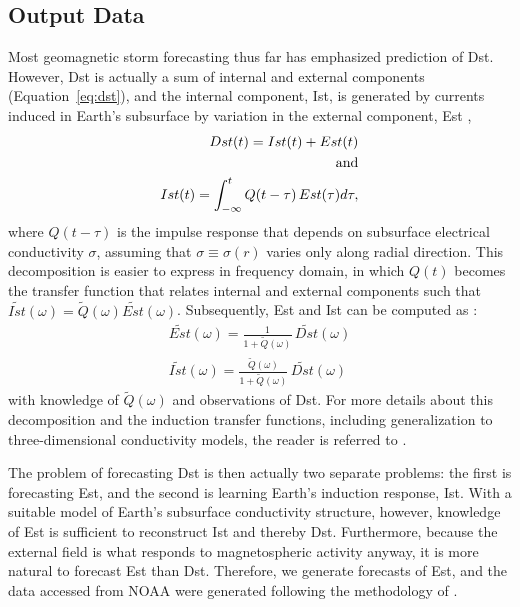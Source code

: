 \documentclass[draft,linenumbers]{agujournal2018}
\begin{document}
\subsection{Output Data}
Most geomagnetic storm forecasting thus far has emphasized prediction of Dst. However, Dst is actually a sum of internal and external components (Equation~\ref{eq:dst}), and the internal component, Ist, is generated by currents induced in Earth's subsurface by variation in the external component, Est \citep{Maus2004},
\begin{eqnarray}
    Dst(t) = Ist(t) + Est(t) \label{eq:dst}\\
    \textnormal{and}\nonumber \\
    Ist(t) = \int_{-\infty}^t Q(t-\tau)\,Est(\tau) d\tau \label{eq:ist},
\end{eqnarray}
where $Q(t-\tau)$ is the impulse response that depends on subsurface electrical conductivity $\sigma$, assuming that $\sigma \equiv \sigma(r)$ varies only along radial direction. This decomposition is easier to express in frequency domain, in which $Q(t)$ becomes the transfer function that relates internal and external components such that $\tilde{Ist}(\omega)=\tilde{Q}(\omega)\tilde{Est}(\omega)$. Subsequently, Est and Ist can be computed as \citep{Maus2004}:
\begin{eqnarray}
    \tilde{Est}(\omega) = \frac{1}{1+\tilde{Q}(\omega)}\,\tilde{Dst}(\omega) \\
    \tilde{Ist}(\omega) = \frac{\tilde{Q}(\omega)}{1+\tilde{Q}(\omega)}\,\tilde{Dst}(\omega)
\end{eqnarray}
with knowledge of $\tilde{Q}(\omega)$ and observations of Dst. For more details about this decomposition and the induction transfer functions, including generalization to three-dimensional conductivity models, the reader is referred to \cite{Maus2004, Olsen2005, Grayver2020}.

The problem of forecasting Dst is then actually two separate problems: the first is forecasting Est, and the second is learning Earth's induction response, Ist. With a suitable model of Earth's subsurface conductivity structure, however, knowledge of Est is sufficient to reconstruct Ist and thereby Dst. Furthermore, because the external field is what responds to magnetospheric activity anyway, it is more natural to forecast Est than Dst. Therefore, we generate forecasts of Est, and the data accessed from NOAA were generated following the methodology of \cite{Maus2004}. 
\end{document}
